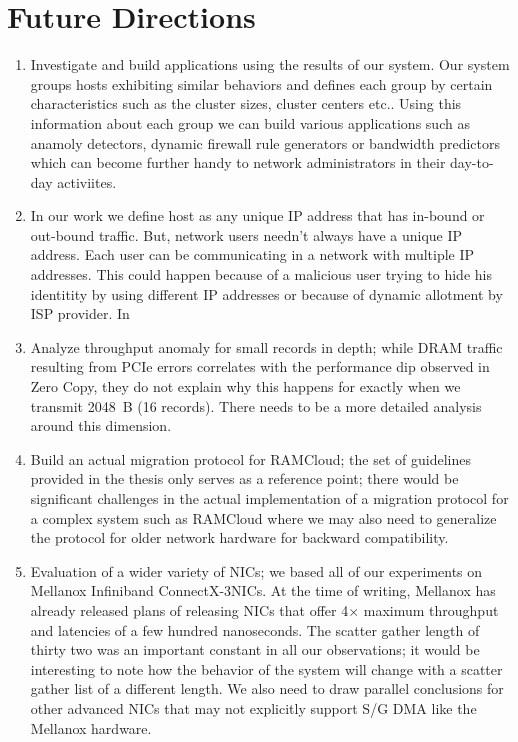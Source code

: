 \section{Future Directions}

\begin{enumerate}
	\item Investigate and build applications using the results of our system. Our system groups hosts exhibiting similar behaviors and defines each group by certain characteristics such as the cluster sizes, cluster centers etc.. Using this information about each group we can build various applications such as anamoly detectors, dynamic firewall rule generators or bandwidth predictors which can become further handy to network administrators in their day-to-day activiites.
	
	\item In our work we define host as any unique IP address that has in-bound or out-bound traffic. But, network users needn't always have a unique IP address. Each user can be communicating in a network with multiple IP addresses. This could happen because of a malicious user trying to hide his identitity by using different IP addresses or because of dynamic allotment by ISP provider. In 
	\item Analyze throughput anomaly for small records in depth; while DRAM traffic resulting from PCIe errors correlates with the performance dip observed in Zero Copy, 
	they do not explain why this happens for exactly when we transmit 2048~B (16 records). There needs to be a more detailed analysis around this dimension.
	\item Build an actual migration protocol for RAMCloud; the set of guidelines provided in the thesis only serves as a reference point; there would be significant challenges 
	in the actual implementation of a migration protocol for a complex system such as RAMCloud where we may also need to generalize the protocol for older network hardware for backward 
	compatibility.
	\item Evaluation of a wider variety of NICs; we based all of our experiments on Mellanox Infiniband ConnectX-3\textregistered NICs. At the time of writing, Mellanox has already 
	released plans of releasing NICs that offer 4$\times$ maximum throughput and latencies of a few hundred nanoseconds. The scatter gather length of thirty two was an important constant in 
	all our observations; it would be interesting to note how the behavior of the system will change with a scatter gather list of a different length. We also need to draw parallel 
	conclusions for other advanced NICs that may not explicitly support S/G DMA like the Mellanox hardware.
\end{enumerate}

